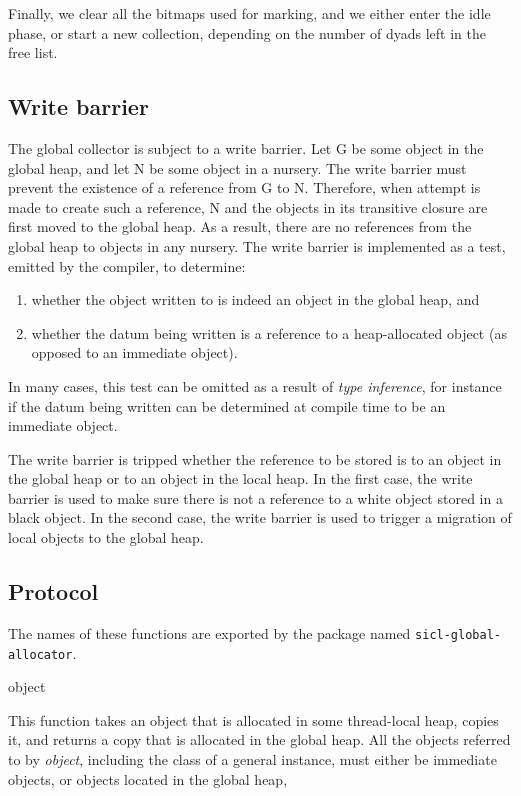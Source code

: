 Finally, we clear all the bitmaps used for marking, and we either
enter the idle phase, or start a new collection, depending on the
number of dyads left in the free list.

\subsection{Write barrier}

The global collector is subject to a write barrier.  Let G be some
object in the global heap, and let N be some object in a nursery.  The
write barrier must prevent the existence of a reference from G to N.
Therefore, when attempt is made to create such a reference, N and the
objects in its transitive closure are first moved to the global heap.
As a result, there are no references from the global heap to objects
in any nursery.  The write barrier is implemented as a test, emitted
by the compiler, to determine:

\begin{enumerate}
\item whether the object written to is indeed an object in the global
  heap, and
\item whether the datum being written is a reference to a
  heap-allocated object (as opposed to an immediate object).
\end{enumerate}

In many cases, this test can be omitted as a result of \emph{type
  inference}, for instance if the datum being written can be
determined at compile time to be an immediate object.

The write barrier is tripped whether the reference to be stored is to
an object in the global heap or to an object in the local heap.  In
the first case, the write barrier is used to make sure there is not a
reference to a white object stored in a black object.  In the second
case, the write barrier is used to trigger a migration of local
objects to the global heap.

\subsection{Protocol}

The names of these functions are exported by the package named
\texttt{sicl-global-allocator}.

 {object}

This function takes an object that is allocated in some thread-local
heap, copies it, and returns a copy that is allocated in the global
heap.  All the objects referred to by \textit{object}, including the
class of a general instance, must either be immediate objects, or
objects located in the global heap,

